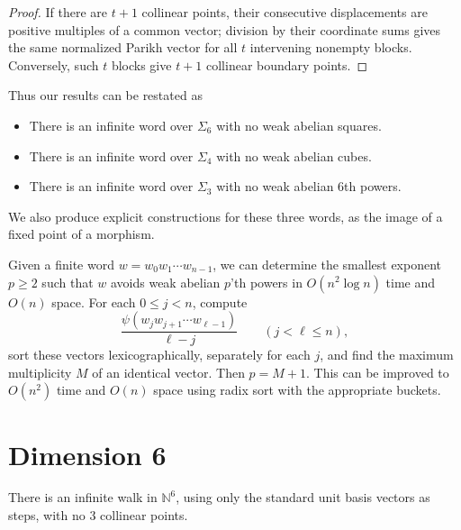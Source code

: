 \documentclass[12pt,reqno]{article}
\newcommand{\N}{\mathbb N}
\begin{document}
\begin{proof}
If there are $t+1$ collinear points, their
consecutive displacements are positive multiples of a common vector;
division by their coordinate sums gives the same normalized Parikh
vector for all $t$ intervening nonempty blocks. Conversely, such $t$
blocks give $t+1$ collinear boundary points.
\end{proof}

Thus our results can be restated as
\begin{itemize}
\item There is an infinite word over $\Sigma_6$
with no weak abelian squares.  

\item There is an infinite word over $\Sigma_4$ with no weak abelian cubes.

\item There is an infinite word over $\Sigma_3$ with no weak abelian $6$th powers.
\end{itemize}
We also produce explicit constructions for these three words, as the image of a fixed point of a morphism.

\begin{remark}
Given a finite word $w=w_0w_1\cdots w_{n-1}$, we can determine
the smallest exponent $p\geq2$ such that $w$ avoids weak abelian
$p$'th powers in $O(n^2\log n)$ time and $O(n)$ space. For each $0\leq j<n$, compute
\[
 \frac{\psi(w_jw_{j+1}\cdots w_{\ell-1})}{\ell-j}
 \qquad (j<\ell\leq n),
\]
sort these vectors lexicographically, separately for each $j$, and find the maximum multiplicity
$M$ of an identical vector. Then $p=M+1$.
This can be improved to $O(n^2)$ time
and $O(n)$ space using
radix sort with the appropriate buckets.
\end{remark}


\section{Dimension 6}\label{sec:6}

\begin{theorem}
There is an infinite walk in $\N^6$, using only the standard unit basis vectors as steps, with no $3$ collinear points.
\label{thm:main}
\end{theorem}
\end{document}
